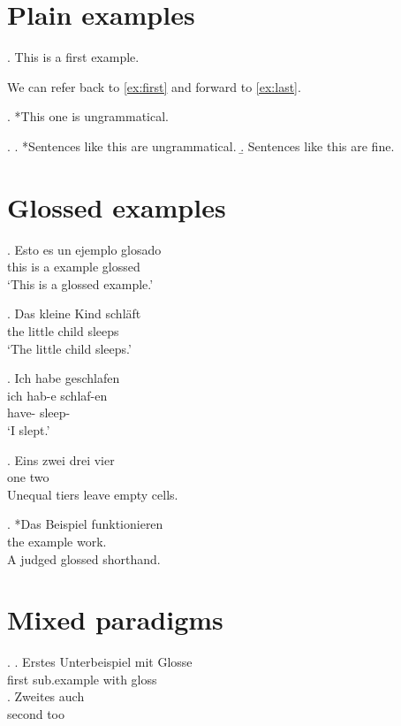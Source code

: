 \documentclass[a4paper]{article}
\begin{document}
\section{Plain examples}

\ex.\label{ex:first} This is a first example.

We can refer back to \ref{ex:first} and forward to \ref{ex:last}.

\ex. *This one is ungrammatical.

\ex.
\a. *Sentences like this are ungrammatical.
\b. Sentences like this are fine.

\section{Glossed examples}

\ex.\label{ex:span} \gll Esto es un ejemplo glosado \\
     this is a example glossed \\
\glt `This is a glossed example.'

\ex. \gll Das {kleine Kind} schl\"aft \\
     the {little child} sleeps \\
\glt `The little child sleeps.'

\ex. \glll Ich habe geschlafen \\
     ich hab-e schlaf-en \\
      have- sleep- \\
\glt `I slept.'

\ex. \gll Eins zwei drei vier \\
     one two \\
\glt Unequal tiers leave empty cells.

\exg. *Das Beispiel funktionieren \\
      the example work. \\
\glt A judged glossed shorthand.

\section{Mixed paradigms}

\ex.
\ag. Erstes Unterbeispiel mit Glosse \\
     first sub.example with gloss \\
\bg. Zweites auch \\
     second too \\
\end{document}
